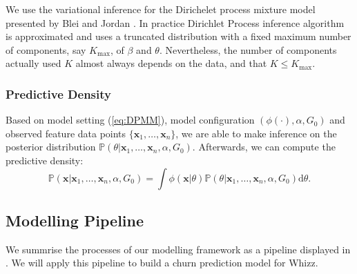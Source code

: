 We use the variational inference for the Dirichelet process mixture model presented by Blei and Jordan \cite{blei2006}. In practice Dirichlet Process inference algorithm is approximated and uses a truncated distribution with a fixed maximum number of components, say $K_{\max}$, of $\beta$ and $\theta$. Nevertheless, the number of components actually used $K$ almost always depends on the data, and that $K \leq K_{\max}$.

\subsubsection{Predictive Density}

Based on model setting (\ref{eq:DPMM}), model configuration $(\phi(\cdot), \alpha, G_0)$ and observed feature data points $\{ \mathbf{x}_1, \dots, \mathbf{x}_n \}$, we are able to make inference on the posterior distribution $\mathbb{P}(\theta | \mathbf{x}_1, \dots, \mathbf{x}_n, \alpha, G_0)$. Afterwards, we can compute the predictive density:
\begin{equation}
\mathbb{P} (\mathbf{x} | \mathbf{x}_1, \dots, \mathbf{x}_n, \alpha, G_0) = \int \phi(\mathbf{x} | \theta ) \mathbb{P}(\theta | \mathbf{x}_1, \dots, \mathbf{x}_n, \alpha, G_0) \text{d} \theta.
\end{equation}

\subsection{Modelling Pipeline}
\label{sec:modelPipeline}

We summrise the processes of our modelling framework as a pipeline displayed in . We will apply this pipeline to build a churn prediction model for Whizz.

